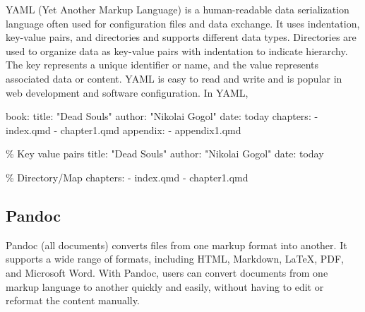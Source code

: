 \documentclass[
  letterpaper,
]{book}
\newenvironment{Shaded}{\begin{snugshade}}{\end{snugshade}}
\newcommand{\AttributeTok}[1]{\textcolor[rgb]{0.40,0.45,0.13}{#1}}
\newcommand{\FunctionTok}[1]{\textcolor[rgb]{0.28,0.35,0.67}{#1}}
\newcommand{\KeywordTok}[1]{\textcolor[rgb]{0.00,0.23,0.31}{#1}}
\newcommand{\PreprocessorTok}[1]{\textcolor[rgb]{0.68,0.00,0.00}{#1}}
\newcommand{\StringTok}[1]{\textcolor[rgb]{0.13,0.47,0.30}{#1}}
\begin{document}
YAML (Yet Another Markup Language) is a human-readable data
serialization language often used for configuration files and data
exchange. It uses indentation, key-value pairs, and directories and
supports different data types. Directories are used to organize data as
key-value pairs with indentation to indicate hierarchy. The key
represents a unique identifier or name, and the value represents
associated data or content. YAML is easy to read and write and is
popular in web development and software configuration. In YAML,

\begin{Shaded}
\begin{Highlighting}[]
\FunctionTok{book}\KeywordTok{:}
\AttributeTok{  }\FunctionTok{title}\KeywordTok{:}\AttributeTok{ }\StringTok{"Dead Souls"}
\AttributeTok{  }\FunctionTok{author}\KeywordTok{:}\AttributeTok{ }\StringTok{"Nikolai Gogol"}
\AttributeTok{  }\FunctionTok{date}\KeywordTok{:}\AttributeTok{ today}
\AttributeTok{  }\FunctionTok{chapters}\KeywordTok{:}
\AttributeTok{    }\KeywordTok{{-}}\AttributeTok{ index.qmd}
\AttributeTok{    }\KeywordTok{{-}}\AttributeTok{ chapter1.qmd}
\AttributeTok{  }\FunctionTok{appendix}\KeywordTok{:}
\AttributeTok{    }\KeywordTok{{-}}\AttributeTok{ appendix1.qmd}
\end{Highlighting}
\end{Shaded}

\begin{Shaded}
\begin{Highlighting}[]
\PreprocessorTok{\% Key value pairs}
\FunctionTok{title}\KeywordTok{:}\AttributeTok{ }\StringTok{"Dead Souls"}
\FunctionTok{author}\KeywordTok{:}\AttributeTok{ }\StringTok{"Nikolai Gogol"}
\FunctionTok{date}\KeywordTok{:}\AttributeTok{ today}

\PreprocessorTok{\% Directory/Map  }
\FunctionTok{chapters}\KeywordTok{:}
\AttributeTok{  }\KeywordTok{{-}}\AttributeTok{ index.qmd}
\AttributeTok{  }\KeywordTok{{-}}\AttributeTok{ chapter1.qmd}
\end{Highlighting}
\end{Shaded}

\hypertarget{pandoc}{%
\subsection{Pandoc}\label{pandoc}}

Pandoc (all documents) converts files from one markup format into
another. It supports a wide range of formats, including HTML, Markdown,
LaTeX, PDF, and Microsoft Word. With Pandoc, users can convert documents
from one markup language to another quickly and easily, without having
to edit or reformat the content manually.
\end{document}
